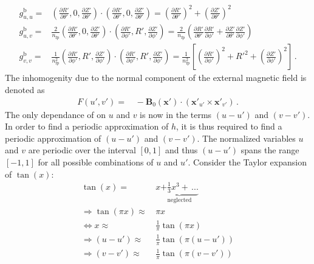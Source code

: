 \begin{align}
  g_{u,u}^\mathrm{b} =&       \left( \frac{\partial R'}{\partial \theta'}, 0, \frac{\partial Z'}{\partial \theta'} \right)
                        \cdot \left( \frac{\partial R'}{\partial \theta'}, 0, \frac{\partial Z'}{\partial \theta'} \right)
                     =  \left(\frac{\partial R'}{\partial \theta'} \right)^2 + \left( \frac{\partial Z'}{\partial \theta'} \right)^2 \label{eqn:guu_b} \\
  g_{u,v}^\mathrm{b} =& \frac{2}{n_\mathrm{fp}}
                              \left( \frac{\partial R'}{\partial \theta'}, 0 , \frac{\partial Z'}{\partial \theta'} \right)
                        \cdot \left( \frac{\partial R'}{\partial \phi'  }, R', \frac{\partial Z'}{\partial \phi'  } \right)
                     = \frac{2}{n_\mathrm{fp}} \left(  \frac{\partial R'}{\partial \theta'} \frac{\partial R'}{\partial \phi'}
                                                     + \frac{\partial Z'}{\partial \theta'} \frac{\partial Z'}{\partial \phi'} \right) \label{eqn:guv_b} \\
  g_{v,v}^\mathrm{b} =& \frac{1}{n_\mathrm{fp}^2} \left( \frac{\partial R'}{\partial \phi'}, R', \frac{\partial Z'}{\partial \phi'} \right)
                        \cdot                     \left( \frac{\partial R'}{\partial \phi'}, R', \frac{\partial Z'}{\partial \phi'} \right)
                     =  \frac{1}{n_\mathrm{fp}^2} \left[  \left( \frac{\partial R'}{\partial \phi'} \right)^2
                                                        + {R'}^2
                                                        + \left( \frac{\partial Z'}{\partial \phi'} \right)^2 \right] \label{eqn:gvv_b} \, .
\end{align}
The inhomogenity due to the normal component of the external magnetic field is denoted as
\begin{align}
  F(u',v') =&\, - \mathbf{B}_0(\mathbf{x}') \cdot \left( \mathbf{x}'_{u'} \times \mathbf{x}'_{v'} \right) \, .
\end{align}
The only dependance of  on $u$ and $v$ is now in the terms $(u-u')$ and $(v-v')$.
In order to find a periodic approximation of $h$, it is thus required to find a periodic approximation of $(u-u')$ and $(v-v')$.
The normalized variables $u$ and $v$ are periodic over the interval $[0, 1]$ and thus $(u-u')$ spans the range $[-1, 1]$
for all possible combinations of $u$ and $u'$.
Consider the Taylor expansion of $\tan(x)$:
\begin{align}
              \tan(    x) =&\,     x \underbrace{+ \frac{1}{3} x^3 + \, ...}_{\mathrm{neglected}} \nonumber \\
  \Rightarrow \tan(\pi x) \approx &\,          \pi           x  \nonumber \\
  \Leftrightarrow      x  \approx &\, \frac{1}{\pi} \tan(\pi x) \nonumber \\
  \Rightarrow      (u-u') \approx &\, \frac{1}{\pi} \tan\left(\pi (u-u')\right) \label{eqn:tan_u} \\
  \Rightarrow      (v-v') \approx &\, \frac{1}{\pi} \tan\left(\pi (v-v')\right) \label{eqn:tan_v}
\end{align}
